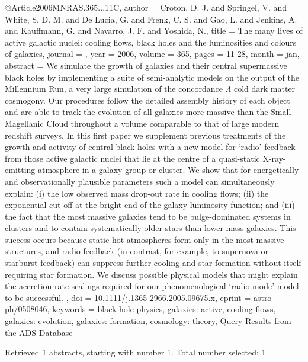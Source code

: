 \documentclass[longauth]{aa}
\begin{document}
{{{{@Article{2006MNRAS.365...11C,
  author   = {Croton, D. J. and Springel, V. and White, S. D. M. and De Lucia, G. and Frenk, C. S. and Gao, L. and Jenkins, A. and Kauffmann, G. and Navarro, J. F. and Yoshida, N.},
  title    = {The many lives of active galactic nuclei: cooling flows, black holes and the luminosities and colours of galaxies},
  journal  = {\mnras},
  year     = {2006},
  volume   = {365},
  pages    = {11-28},
  month    = jan,
  abstract = {We simulate the growth of galaxies and their central supermassive black
holes by implementing a suite of semi-analytic models on the output of
the Millennium Run, a very large simulation of the concordance {$\Lambda$}
cold dark matter cosmogony. Our procedures follow the detailed assembly
history of each object and are able to track the evolution of all
galaxies more massive than the Small Magellanic Cloud throughout a
volume comparable to that of large modern redshift surveys. In this
first paper we supplement previous treatments of the growth and activity
of central black holes with a new model for `radio' feedback from those
active galactic nuclei that lie at the centre of a quasi-static
X-ray-emitting atmosphere in a galaxy group or cluster. We show that for
energetically and observationally plausible parameters such a model can
simultaneously explain: (i) the low observed mass drop-out rate in
cooling flows; (ii) the exponential cut-off at the bright end of the
galaxy luminosity function; and (iii) the fact that the most massive
galaxies tend to be bulge-dominated systems in clusters and to contain
systematically older stars than lower mass galaxies. This success occurs
because static hot atmospheres form only in the most massive structures,
and radio feedback (in contrast, for example, to supernova or starburst
feedback) can suppress further cooling and star formation without itself
requiring star formation. We discuss possible physical models that might
explain the accretion rate scalings required for our phenomenological
`radio mode' model to be successful.
},
  doi      = {10.1111/j.1365-2966.2005.09675.x},
  eprint   = {astro-ph/0508046},
  keywords = {black hole physics, galaxies: active, cooling flows, galaxies: evolution, galaxies: formation, cosmology: theory},
}
Query Results from the ADS Database


Retrieved 1 abstracts, starting with number 1.  Total number selected: 1.

}}}}
\end{document}
